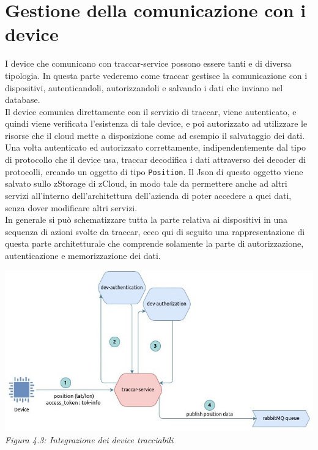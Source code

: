 \documentclass[a4paper,titlepage,12pt]{book}
\begin{document}
{\section{
Gestione della comunicazione con i device}
I device che comunicano con traccar-service possono essere tanti e di diversa tipologia. In questa parte vederemo come traccar gestisce la comunicazione con i dispositivi, autenticandoli, autorizzandoli e salvando i dati che inviano nel database.\\
Il device comunica direttamente con il servizio di traccar, viene autenticato, e quindi viene verificata l'esistenza di tale device, e poi autorizzato ad utilizzare le risorse che il cloud mette a disposizione come ad esempio il salvataggio dei dati. Una volta autenticato ed autorizzato correttamente, indipendentemente dal tipo di protocollo che il device usa, traccar decodifica i dati attraverso dei decoder di protocolli, creando un oggetto di tipo \texttt{Position}. Il Json di questo oggetto viene salvato sullo zStorage di zCloud, in modo tale da permettere anche ad altri servizi all'interno dell'architettura dell'azienda di poter accedere a quei dati, senza dover modificare altri servizi.\\
In generale si può schematizzare tutta la parte relativa ai dispositivi in una sequenza di azioni svolte da traccar, ecco qui di seguito una rappresentazione di questa parte architetturale che comprende solamente la parte di autorizzazione, autenticazione e memorizzazione dei dati.

\begin{center}

\includegraphics[scale=0.6]{images/dev-aut-traccar.jpg}\\ 
\textit{Figura 4.3: Integrazione dei device tracciabili}
\end{center}

}
\end{document}
